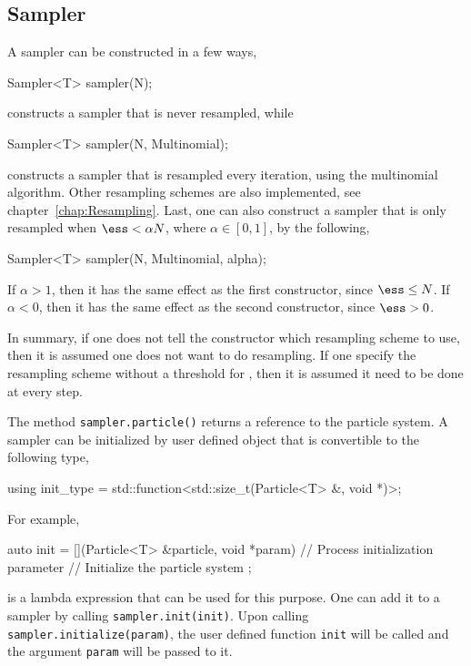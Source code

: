 \subsection{Sampler}
\label{sub:Sampler}

A sampler can be constructed in a few ways,
\begin{cppcode}
  Sampler<T> sampler(N);
\end{cppcode}
constructs a sampler that is never resampled, while
\begin{cppcode}
  Sampler<T> sampler(N, Multinomial);
\end{cppcode}
constructs a sampler that is resampled every iteration, using the multinomial
algorithm. Other resampling schemes are also implemented, see
chapter~\ref{chap:Resampling}. Last, one can also construct a sampler that is
only resampled when $\ess < \alpha N$, where $\alpha\in[0, 1]$, by the
following,
\begin{cppcode}
  Sampler<T> sampler(N, Multinomial, alpha);
\end{cppcode}
If $\alpha > 1$, then it has the same effect as the first constructor, since
$\ess \le N$. If $\alpha < 0$, then it has the same effect as the second
constructor, since $\ess > 0$.

In summary, if one does not tell the constructor which resampling scheme to
use, then it is assumed one does not want to do resampling. If one specify the
resampling scheme without a threshold for \ess, then it is assumed it need to
be done at every step.

The method \verb|sampler.particle()| returns a reference to the particle
system. A sampler can be initialized by user defined object that is convertible
to the following type,
\begin{cppcode}
  using init_type = std::function<std::size_t(Particle<T> &, void *)>;
\end{cppcode}
For example,
\begin{cppcode}
  auto init = [](Particle<T> &particle, void *param) {
      // Process initialization parameter
      // Initialize the particle system
  };
\end{cppcode}
is a \cppoo lambda expression that can be used for this purpose. One can add it
to a sampler by calling \verb|sampler.init(init)|. Upon calling
\verb|sampler.initialize(param)|, the user defined function \verb|init| will be
called and the argument \verb|param| will be passed to it.

